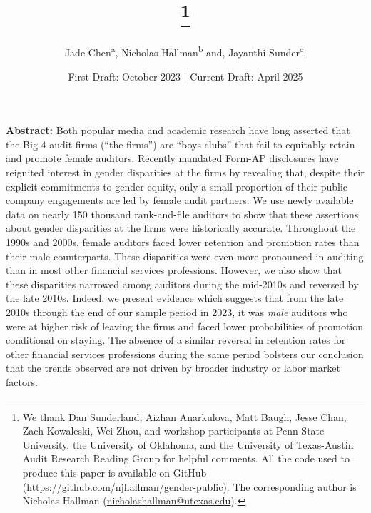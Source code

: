 \documentclass[11pt]{article}
\title{\papertitle\footnote{We thank Dan Sunderland, Aizhan Anarkulova, Matt Baugh, Jesse Chan, Zach Kowaleski, Wei Zhou, and workshop participants at Penn State University, the University of Oklahoma, and the University of Texas-Austin Audit Research Reading Group for helpful comments. All the code used to produce this paper is available on GitHub (\url{https://github.com/njhallman/gender-public}). The corresponding author is Nicholas Hallman (\url{nicholashallman@utexas.edu}).}}
\author{
    \vspace{.5cm}Jade Chen\textsuperscript{a}, 
    Nicholas Hallman\textsuperscript{b} and, 
    Jayanthi Sunder\textsuperscript{c}, 
}
\affil{\vspace{.5cm}\textsuperscript{a}Loyola Marymount University}
\affil{\textsuperscript{b}The University of Texas at Austin and the Salem Center for Policy}
\affil{\textsuperscript{c}The University of Arizona}
\date{First Draft: October 2023 \quad $\vert$ \quad Current Draft: April 2025}
\begin{document}



% 

% 

% 


\maketitle %

\newpage
{}


\centerline{\LARGE\papertitle}


\vspace{1cm}
\normalsize


\noindent
\textbf{Abstract:} Both popular media and academic research have long asserted that the Big 4 audit firms (``the firms'') are ``boys clubs'' that fail to equitably retain and promote female auditors. Recently mandated Form-AP disclosures have reignited interest in gender disparities at the firms by revealing that, despite their explicit commitments to gender equity, only a small proportion of their public company engagements are led by female audit partners. We use newly available data on nearly 150 thousand rank-and-file auditors to show that these assertions about gender disparities at the firms were historically accurate. Throughout the 1990s and 2000s, female auditors faced lower retention and promotion rates than their male counterparts. These disparities were even more pronounced in auditing than in most other financial services professions. However, we also show that these disparities narrowed among auditors during the mid-2010s and reversed by the late 2010s. Indeed, we present evidence which suggests that from the late 2010s through the end of our sample period in 2023, it was \textit{male} auditors who were at higher risk of leaving the firms and faced lower probabilities of promotion conditional on staying. The absence of a similar reversal in retention rates for other financial services professions during the same period bolsters our conclusion that the trends observed are not driven by broader industry or labor market factors.
\end{document}
